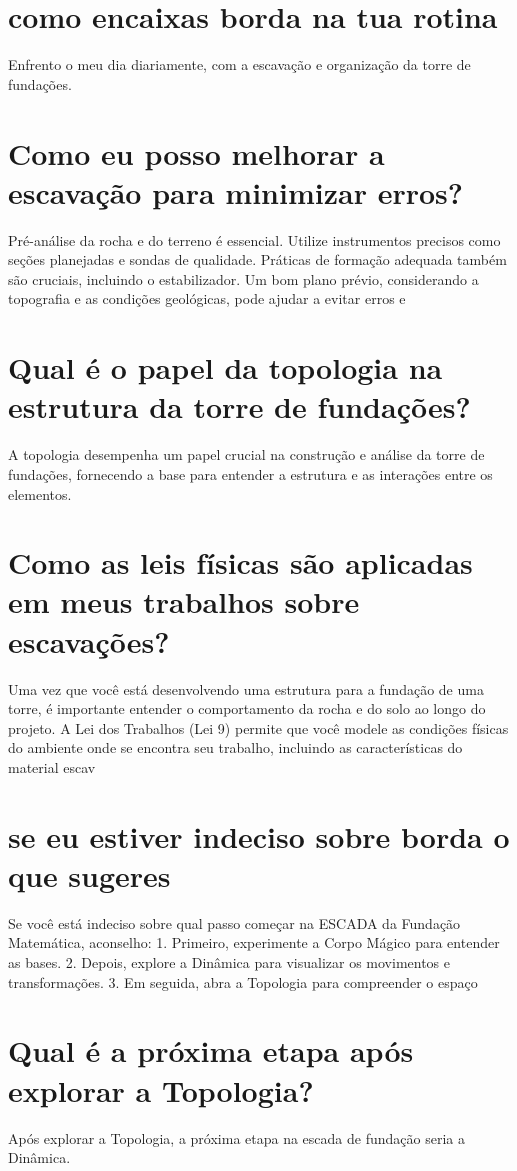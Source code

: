 \documentclass[11pt,a4paper]{article}
\begin{document}
\section{como encaixas borda na tua rotina}
Enfrento o meu dia diariamente, com a escavação e organização da torre de fundações.

\section{Como eu posso melhorar a escavação para minimizar erros?}
Pré-análise da rocha e do terreno é essencial. Utilize instrumentos precisos como seções planejadas e sondas de qualidade. Práticas de formação adequada também são cruciais, incluindo o estabilizador. Um bom plano prévio, considerando a topografia e as condições geológicas, pode ajudar a evitar erros e

\section{Qual é o papel da topologia na estrutura da torre de fundações?}
A topologia desempenha um papel crucial na construção e análise da torre de fundações, fornecendo a base para entender a estrutura e as interações entre os elementos.

\section{Como as leis físicas são aplicadas em meus trabalhos sobre escavações?}
Uma vez que você está desenvolvendo uma estrutura para a fundação de uma torre, é importante entender o comportamento da rocha e do solo ao longo do projeto. A Lei dos Trabalhos (Lei 9) permite que você modele as condições físicas do ambiente onde se encontra seu trabalho, incluindo as características do material escav

\section{se eu estiver indeciso sobre borda o que sugeres}
Se você está indeciso sobre qual passo começar na ESCADA da Fundação Matemática, aconselho: 1. Primeiro, experimente a Corpo Mágico para entender as bases. 2. Depois, explore a Dinâmica para visualizar os movimentos e transformações. 3. Em seguida, abra a Topologia para compreender o espaço

\section{Qual é a próxima etapa após explorar a Topologia?}
Após explorar a Topologia, a próxima etapa na escada de fundação seria a Dinâmica.
\end{document}
